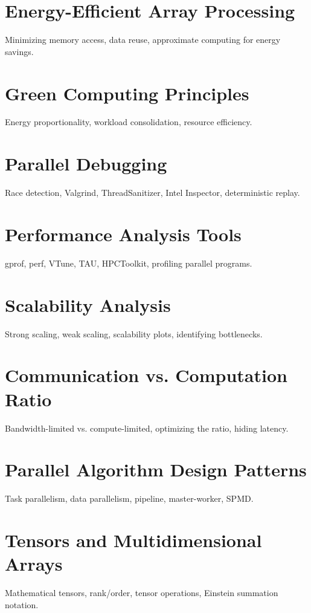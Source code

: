 \chapter{Energy-Efficient Array Processing}
Minimizing memory access, data reuse, approximate computing for energy savings.

\chapter{Green Computing Principles}
Energy proportionality, workload consolidation, resource efficiency.

\chapter{Parallel Debugging}
Race detection, Valgrind, ThreadSanitizer, Intel Inspector, deterministic replay.

\chapter{Performance Analysis Tools}
gprof, perf, VTune, TAU, HPCToolkit, profiling parallel programs.

\chapter{Scalability Analysis}
Strong scaling, weak scaling, scalability plots, identifying bottlenecks.

\chapter{Communication vs. Computation Ratio}
Bandwidth-limited vs. compute-limited, optimizing the ratio, hiding latency.

\chapter{Parallel Algorithm Design Patterns}
Task parallelism, data parallelism, pipeline, master-worker, SPMD.


\chapter{Tensors and Multidimensional Arrays}
Mathematical tensors, rank/order, tensor operations, Einstein summation notation.

